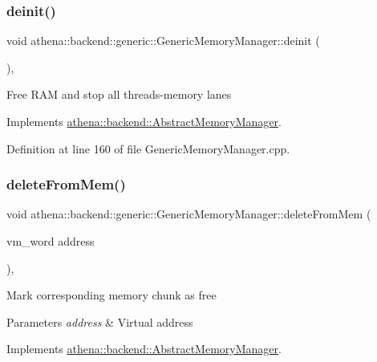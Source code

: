 \subsubsection{\texorpdfstring{deinit()}{deinit()}}
{\footnotesize\ttfamily void athena\+::backend\+::generic\+::\+Generic\+Memory\+Manager\+::deinit (\begin{DoxyParamCaption}{ }\end{DoxyParamCaption})\hspace{0.3cm}{\ttfamily [override]}, {\ttfamily [virtual]}}

Free R\+AM and stop all threads-\/memory lanes 

Implements \mbox{\hyperlink{classathena_1_1backend_1_1_abstract_memory_manager}{athena\+::backend\+::\+Abstract\+Memory\+Manager}}.



Definition at line 160 of file Generic\+Memory\+Manager.\+cpp.

\mbox{\label{classathena_1_1backend_1_1generic_1_1_generic_memory_manager_a2767b6c1f5887a2928b665e0c1b454c7}} 
\subsubsection{\texorpdfstring{delete\+From\+Mem()}{deleteFromMem()}}
{\footnotesize\ttfamily void athena\+::backend\+::generic\+::\+Generic\+Memory\+Manager\+::delete\+From\+Mem (\begin{DoxyParamCaption}\item[{vm\+\_\+word}]{address }\end{DoxyParamCaption})\hspace{0.3cm}{\ttfamily [override]}, {\ttfamily [virtual]}}

Mark corresponding memory chunk as free 
\begin{DoxyParams}{Parameters}
{\em address} & Virtual address \\
\hline
\end{DoxyParams}


Implements \mbox{\hyperlink{classathena_1_1backend_1_1_abstract_memory_manager_a8ffd6cf21559978f394e2e11815506b5}{athena\+::backend\+::\+Abstract\+Memory\+Manager}}.



